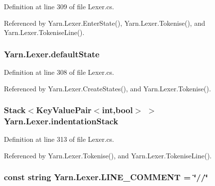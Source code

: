 Definition at line 309 of file Lexer.\-cs.



Referenced by Yarn.\-Lexer.\-Enter\-State(), Yarn.\-Lexer.\-Tokenise(), and Yarn.\-Lexer.\-Tokenise\-Line().

\hypertarget{a00117_a16b5dbf27a377cde5e8ba0eaa05b5710}{
\subsubsection[{default\-State}]{ Yarn.\-Lexer.\-default\-State\hspace{0.3cm}{\ttfamily [private]}}}\label{a00117_a16b5dbf27a377cde5e8ba0eaa05b5710}


Definition at line 308 of file Lexer.\-cs.



Referenced by Yarn.\-Lexer.\-Create\-States(), and Yarn.\-Lexer.\-Tokenise().

\hypertarget{a00117_a6631a1b1a9109258ab18927e7587ff9b}{
\subsubsection[{indentation\-Stack}]{\setlength{\rightskip}{0pt plus 5cm}Stack$<$Key\-Value\-Pair$<$int,bool$>$ $>$ Yarn.\-Lexer.\-indentation\-Stack\hspace{0.3cm}{\ttfamily [private]}}}\label{a00117_a6631a1b1a9109258ab18927e7587ff9b}


Definition at line 313 of file Lexer.\-cs.



Referenced by Yarn.\-Lexer.\-Tokenise(), and Yarn.\-Lexer.\-Tokenise\-Line().

\hypertarget{a00117_a29c457125cc4876f8571f5d9afa372e2}{
\subsubsection[{L\-I\-N\-E\-\_\-\-C\-O\-M\-M\-E\-N\-T}]{\setlength{\rightskip}{0pt plus 5cm}const string Yarn.\-Lexer.\-L\-I\-N\-E\-\_\-\-C\-O\-M\-M\-E\-N\-T = \char`\"{}//\char`\"{}\hspace{0.3cm}{\ttfamily [private]}}}\label{a00117_a29c457125cc4876f8571f5d9afa372e2}


